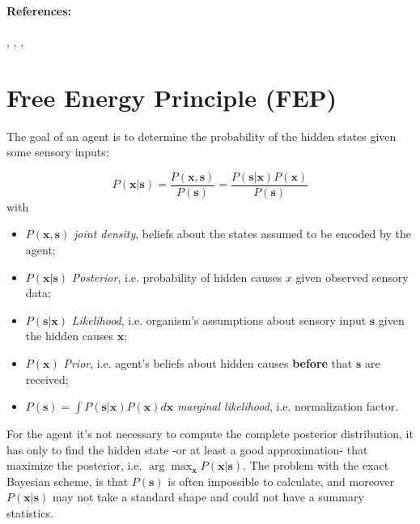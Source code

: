 \documentclass[a4paper, 10pt]{article}
\begin{document}
\paragraph{\textbf{References:}} 
\cite{Baltieri2019}, \cite{Buckley2017}, \cite{Bogacz2017},




\section{Free Energy Principle (FEP)}
The goal of an agent is to determine the probability of the hidden states given some sensory inputs:

\begin{equation}
P(\mathbf{x}|\mathbf{s}) = \frac{P(\mathbf{x},\mathbf{s})}{P(\mathbf{s})} = \frac{P(\mathbf{s}|\mathbf{x})P(\mathbf{x})}{P(\mathbf{s})}
\end{equation}
with
\begin{itemize}

\item $P(\mathbf{x},\mathbf{s})$ \emph{joint density}, beliefs about the states assumed to be encoded by the agent;

\item $P(\mathbf{x}|\mathbf{s})$ \emph{Posterior}, i.e. probability of hidden causes $x$ given observed sensory data; 

\item $P(\mathbf{s}|\mathbf{x})$ \emph{Likelihood}, i.e. organism's assumptions about sensory input $\mathbf{s}$ given the hidden causes $\mathbf{x}$;

\item $P(\mathbf x)$ \emph{Prior}, i.e. agent's beliefs about hidden causes \textbf{before} that $\mathbf s$ are received;

\item $P(\mathbf s)=\int P(\mathbf s|\mathbf x)P(\mathbf x) d\mathbf x $ \emph{marginal likelihood}, i.e. normalization factor.

\end{itemize}

For the agent it's not necessary to compute the complete posterior distribution, it has only to find the hidden state -or at least a good approximation- that maximize the posterior, i.e. $\arg \max_{\mathbf{x}} P(\mathbf x|\mathbf s)$.
The problem with the exact Bayesian scheme, is that $P(\mathbf s)$ is often impossible to calculate, and moreover $P(\mathbf x|\mathbf s)$ may not take a standard shape and could not have a summary statistics. 
\end{document}
